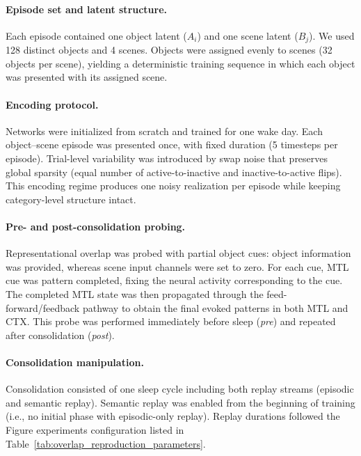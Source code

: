 \documentclass{article}
\begin{document}
\paragraph{Episode set and latent structure.}
Each episode contained one object latent ($A_i$) and one scene latent ($B_j$). We used 128 distinct objects and 4 scenes. Objects were assigned evenly to scenes (32 objects per scene), yielding a deterministic training sequence in which each object was presented with its assigned scene.

\paragraph{Encoding protocol.}
Networks were initialized from scratch and trained for one wake day. Each object--scene episode was presented once, with fixed duration (5 timesteps per episode). Trial-level variability was introduced by swap noise that preserves global sparsity (equal number of active-to-inactive and inactive-to-active flips). This encoding regime produces one noisy realization per episode while keeping category-level structure intact.

\paragraph{Pre- and post-consolidation probing.}
Representational overlap was probed with partial object cues: object information was provided, whereas scene input channels were set to zero. For each cue, MTL cue was pattern completed, fixing the neural activity corresponding to the cue. The completed MTL state was then propagated through the feed-forward/feedback pathway to obtain the final evoked patterns in both MTL and CTX. This probe was performed immediately before sleep (\textit{pre}) and repeated after consolidation (\textit{post}).

\paragraph{Consolidation manipulation.}
Consolidation consisted of one sleep cycle including both replay streams (episodic and semantic replay). Semantic replay was enabled from the beginning of training (i.e., no initial phase with episodic-only replay). Replay durations followed the Figure experiments configuration listed in Table~\ref{tab:overlap_reproduction_parameters}.
\end{document}

